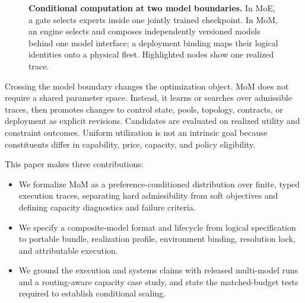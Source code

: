\begin{figure}[H]
  \centering
  \resizebox{\linewidth}{!}{}
  \caption{\textbf{Conditional computation at two model boundaries.} In MoE,
  a gate selects experts inside one jointly trained checkpoint. In MoM, an
  engine selects and composes independently versioned models behind one model
  interface; a deployment binding maps their logical identities onto a physical
  fleet. Highlighted nodes show one realized trace.}
  \label{fig:moe-vs-mom}
\end{figure}

Crossing the model boundary changes the optimization object. MoM does not
require a shared parameter space. Instead, it learns or searches over
admissible traces, then promotes changes to control state, pools, topology,
contracts, or deployment as explicit revisions. Candidates are evaluated on
realized utility and constraint outcomes. Uniform utilization is not an
intrinsic goal because constituents differ in capability, price, capacity, and
policy eligibility.

This paper makes three contributions:
\begin{itemize}
  \item We formalize MoM as a preference-conditioned distribution over finite,
  typed execution traces, separating hard admissibility from soft objectives
  and defining capacity diagnostics and failure criteria.
  \item We specify a composite-model format and lifecycle from logical
  specification to portable bundle, realization profile, environment binding,
  resolution lock, and attributable execution.
  \item We ground the execution and systems claims with released multi-model
  runs and a routing-aware capacity case study, and state the matched-budget
  tests required to establish conditional scaling.
\end{itemize}
